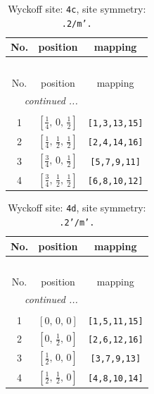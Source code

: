 \documentclass[fleqn,8pt]{jsarticle}
\begin{document}
\renewcommand{\arraystretch}{1.2}
\begin{longtable}{ccc}
\caption{Wyckoff site: {\tt 4c}, site symmetry: {\tt .2/m'.}}
 \\
 \hline \hline
No. & position & mapping \\ \hline \endfirsthead

\multicolumn{2}{l}{\tablename\ \thetable{}} \\
 \hline \hline
No. & position & mapping \\ \hline \endhead

 \hline \hline
\multicolumn{2}{r}{\footnotesize\it continued ...} \\ \endfoot

 \hline \hline
\multicolumn{2}{r}{} \\ \endlastfoot

1 & $\left[ \frac{1}{4},\, 0,\, \frac{1}{2} \right]$ & {\tt [1,3,13,15]} \\ \hline
2 & $\left[ \frac{1}{4},\, \frac{1}{2},\, \frac{1}{2} \right]$ & {\tt [2,4,14,16]} \\ \hline
3 & $\left[ \frac{3}{4},\, 0,\, \frac{1}{2} \right]$ & {\tt [5,7,9,11]} \\ \hline
4 & $\left[ \frac{3}{4},\, \frac{1}{2},\, \frac{1}{2} \right]$ & {\tt [6,8,10,12]} \\
\end{longtable}
\renewcommand{\arraystretch}{1.2}
\begin{longtable}{ccc}
\caption{Wyckoff site: {\tt 4d}, site symmetry: {\tt .2'/m'.}}
 \\
 \hline \hline
No. & position & mapping \\ \hline \endfirsthead

\multicolumn{2}{l}{\tablename\ \thetable{}} \\
 \hline \hline
No. & position & mapping \\ \hline \endhead

 \hline \hline
\multicolumn{2}{r}{\footnotesize\it continued ...} \\ \endfoot

 \hline \hline
\multicolumn{2}{r}{} \\ \endlastfoot

1 & $\left[ 0,\, 0,\, 0 \right]$ & {\tt [1,5,11,15]} \\ \hline
2 & $\left[ 0,\, \frac{1}{2},\, 0 \right]$ & {\tt [2,6,12,16]} \\ \hline
3 & $\left[ \frac{1}{2},\, 0,\, 0 \right]$ & {\tt [3,7,9,13]} \\ \hline
4 & $\left[ \frac{1}{2},\, \frac{1}{2},\, 0 \right]$ & {\tt [4,8,10,14]} \\
\end{longtable}
\end{document}
